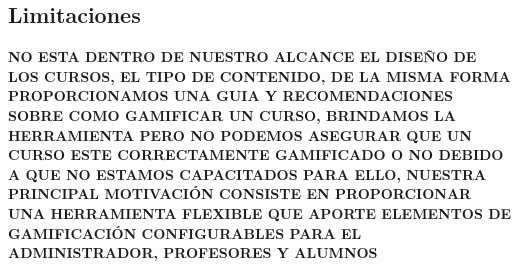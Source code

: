      

\subsection{Limitaciones}
\label{subsec:limitaciones}

{\bf\color{red} NO ESTA DENTRO DE NUESTRO ALCANCE EL DISEÑO DE LOS CURSOS, EL TIPO DE CONTENIDO, DE LA MISMA FORMA PROPORCIONAMOS UNA GUIA Y RECOMENDACIONES SOBRE COMO GAMIFICAR UN CURSO, BRINDAMOS LA HERRAMIENTA PERO NO PODEMOS ASEGURAR QUE UN CURSO ESTE CORRECTAMENTE GAMIFICADO O NO DEBIDO A QUE NO ESTAMOS CAPACITADOS PARA ELLO, NUESTRA PRINCIPAL MOTIVACIÓN CONSISTE EN PROPORCIONAR UNA HERRAMIENTA FLEXIBLE QUE APORTE ELEMENTOS DE GAMIFICACIÓN CONFIGURABLES PARA EL ADMINISTRADOR, PROFESORES Y ALUMNOS}



